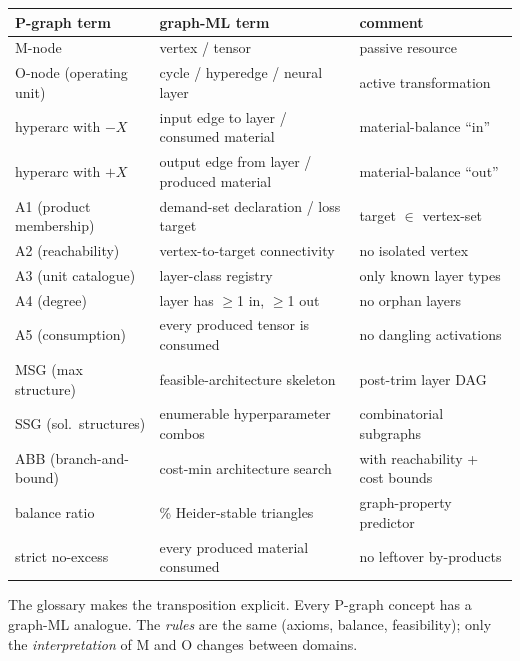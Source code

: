 \documentclass[11pt,a4paper]{article}
\begin{document}
\begin{center}
\begin{tabular}{l l l}
\toprule
P-graph term            & graph-ML term                                       & comment \\
\midrule
M-node                  & vertex / tensor                                     & passive resource \\
O-node (operating unit) & cycle / hyperedge / neural layer                    & active transformation \\
hyperarc with $-X$      & input edge to layer / consumed material             & material-balance ``in'' \\
hyperarc with $+X$      & output edge from layer / produced material          & material-balance ``out'' \\
A1 (product membership) & demand-set declaration / loss target                & target $\in$ vertex-set \\
A2 (reachability)       & vertex-to-target connectivity                       & no isolated vertex \\
A3 (unit catalogue)     & layer-class registry                                & only known layer types \\
A4 (degree)             & layer has $\geq$1 in, $\geq$1 out                   & no orphan layers \\
A5 (consumption)        & every produced tensor is consumed                   & no dangling activations \\
MSG (max structure)     & feasible-architecture skeleton                      & post-trim layer DAG \\
SSG (sol.\ structures)  & enumerable hyperparameter combos                    & combinatorial subgraphs \\
ABB (branch-and-bound)  & cost-min architecture search                        & with reachability + cost bounds \\
balance ratio           & \% Heider-stable triangles                          & graph-property predictor \\
strict no-excess        & every produced material consumed                    & no leftover by-products \\
\bottomrule
\end{tabular}
\end{center}

The glossary makes the transposition explicit. Every P-graph concept
has a graph-ML analogue. The \emph{rules} are the same (axioms,
balance, feasibility); only the \emph{interpretation} of M and O
changes between domains.
\end{document}
